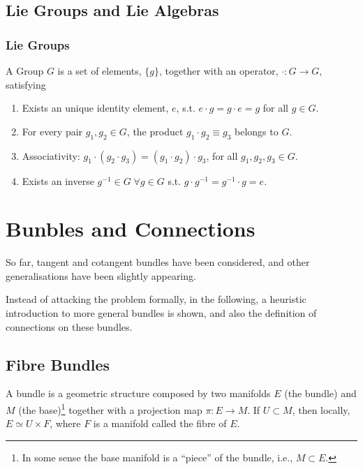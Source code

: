\section{Lie Groups and Lie Algebras}

\subsection{Lie Groups}

\begin{Def}[Group]
  A {\sc Group} $G$ is a set of elements, $\{g\}$, together with an operator, $\cdot: G\to G$, satisfying
  \begin{enumerate}
  \item Exists an unique identity element, $e$, s.t. $e\cdot g=g\cdot e =g$ for all $g\in G$.
  \item For every pair $g_1,g_2\in G$, the product $g_1\cdot g_2\equiv g_3$ belongs to $G$.
  \item Associativity: $g_1\cdot(g_2\cdot g_3)= (g_1\cdot g_2)\cdot g_3$, for all $g_1,g_2,g_3\in G$.
  \item Exists an inverse $g^{-1}\in G\; \forall g\in G$ s.t. $g\cdot g^{-1}=g^{-1}\cdot g=e$.
  \end{enumerate}
\end{Def}




\chapter{Bunbles and Connections}

So far, tangent and cotangent bundles have been considered, and other generalisations have been slightly appearing.

Instead of attacking the problem formally, in the following, a heuristic introduction to more general bundles is shown, and also the definition of connections on these bundles.

\section{Fibre Bundles}

A bundle is a geometric structure composed by two manifolds $E$ (the bundle) and $M$ (the base)\footnote{In some sense the base manifold is a ``piece'' of the bundle, i.e., $M\subset E$.} together with a projection map $\pi:E\to M$. If $U\subset M$, then locally, $E\simeq U\times F$, where $F$ is a manifold called the fibre of $E$. 

